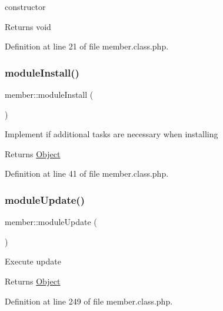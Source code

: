 constructor

\begin{DoxyReturn}{Returns}
void 
\end{DoxyReturn}


Definition at line 21 of file member.\+class.\+php.

\hypertarget{classmember_a5834fa338d03eedcb5e84bb8ccac305b}{}\label{classmember_a5834fa338d03eedcb5e84bb8ccac305b} 
\subsubsection{\texorpdfstring{module\+Install()}{moduleInstall()}}
{\footnotesize\ttfamily member\+::module\+Install (\begin{DoxyParamCaption}{ }\end{DoxyParamCaption})}

Implement if additional tasks are necessary when installing

\begin{DoxyReturn}{Returns}
\hyperlink{classObject}{Object} 
\end{DoxyReturn}


Definition at line 41 of file member.\+class.\+php.

\hypertarget{classmember_a72b7382e568644ccadb69b67e4504086}{}\label{classmember_a72b7382e568644ccadb69b67e4504086} 
\subsubsection{\texorpdfstring{module\+Update()}{moduleUpdate()}}
{\footnotesize\ttfamily member\+::module\+Update (\begin{DoxyParamCaption}{ }\end{DoxyParamCaption})}

Execute update

\begin{DoxyReturn}{Returns}
\hyperlink{classObject}{Object} 
\end{DoxyReturn}


Definition at line 249 of file member.\+class.\+php.

\hypertarget{classmember_ab5bc32f3821f7cba98e34703679c69ee}{}\label{classmember_ab5bc32f3821f7cba98e34703679c69ee} 
